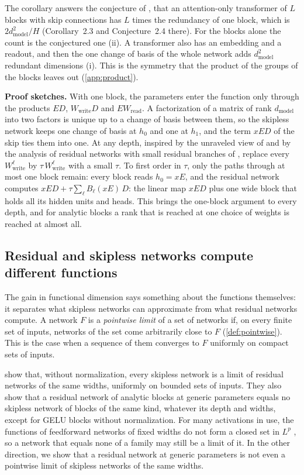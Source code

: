 \documentclass[10pt]{article}
\theoremstyle{definition}
\theoremstyle{remark}
\newcommand{\Wread}{W_{\mathrm{read}}}
\newcommand{\Wwrite}{W_{\mathrm{write}}}
\newcommand{\dm}{d_{\mathrm{model}}}
\newcommand{\para}[1]{\smallskip\noindent\textbf{#1}\hspace{0.5em}}
\begin{document}
The corollary answers the conjecture of \citet{henry2026generic}, that an attention-only transformer of $L$ blocks with skip connections has $L$ times the redundancy of one block, which is $2\dm^2/H$ (Corollary~2.3 and Conjecture~2.4 there). For the blocks alone the count is the conjectured one (ii). A transformer also has an embedding and a readout, and then the one change of basis of the whole network adds $\dm^2$ redundant dimensions (i). This is the symmetry that the product of the groups of the blocks leaves out (\cref{app:product}).

\para{Proof sketches.} With one block, the parameters enter the function only through the products $ED$, $\Wwrite D$ and $E\Wread$. A factorization of a matrix of rank $\dm$ into two factors is unique up to a change of basis between them, so the skipless network keeps one change of basis at $h_0$ and one at $h_1$, and the term $xED$ of the skip ties them into one. At any depth, inspired by the unraveled view of \citet{veit2016ensembles} and by the analysis of residual networks with small residual branches of \citet{hardt2017identity}, replace every $\Wwrite^{\ell}$ by $\tau\,\Wwrite^{\ell}$ with a small $\tau$. To first order in $\tau$, only the paths through at most one block remain: every block reads $h_0 = xE$, and the residual network computes $xED + \tau\sum_{\ell} B_\ell(xE)\,D$: the linear map $xED$ plus one wide block that holds all its hidden units and heads. This brings the one-block argument to every depth, and for analytic blocks a rank that is reached at one choice of weights is reached at almost all.

\subsection{Residual and skipless networks compute different functions}\label{sec:classes}

The gain in functional dimension says something about the functions themselves: it separates what skipless networks can approximate from what residual networks compute. A network $F$ is a \emph{pointwise limit} of a set of networks if, on every finite set of inputs, networks of the set come arbitrarily close to $F$ (\cref{def:pointwise}). This is the case when a sequence of them converges to $F$ uniformly on compact sets of inputs.

\citet{mijoski2026worth} show that, without normalization, every skipless network is a limit of residual networks of the same widths, uniformly on bounded sets of inputs. They also show that a residual network of analytic blocks at generic parameters equals no skipless network of blocks of the same kind, whatever its depth and widths, except for GELU blocks without normalization. For many activations in use, the functions of feedforward networks of fixed widths do not form a closed set in $L^p$ \citep[Theorem~3.1]{petersen2021topological}, so a network that equals none of a family may still be a limit of it. In the other direction, we show that a residual network at generic parameters is not even a pointwise limit of skipless networks of the same widths.
\end{document}
